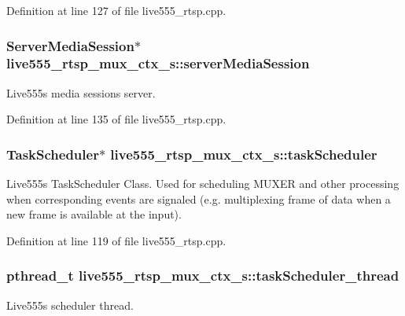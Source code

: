 Definition at line 127 of file live555\+\_\+rtsp.\+cpp.

\subsubsection[{\texorpdfstring{server\+Media\+Session}{serverMediaSession}}]{\setlength{\rightskip}{0pt plus 5cm}Server\+Media\+Session$\ast$ live555\+\_\+rtsp\+\_\+mux\+\_\+ctx\+\_\+s\+::server\+Media\+Session}\hypertarget{structlive555__rtsp__mux__ctx__s_acd9455b0d78bac504d4de35d55729e02}{}\label{structlive555__rtsp__mux__ctx__s_acd9455b0d78bac504d4de35d55729e02}
Live555\textquotesingle{}s media sessions server. 

Definition at line 135 of file live555\+\_\+rtsp.\+cpp.

\subsubsection[{\texorpdfstring{task\+Scheduler}{taskScheduler}}]{\setlength{\rightskip}{0pt plus 5cm}Task\+Scheduler$\ast$ live555\+\_\+rtsp\+\_\+mux\+\_\+ctx\+\_\+s\+::task\+Scheduler}\hypertarget{structlive555__rtsp__mux__ctx__s_a9cee4d2b64755aad6fd9d98fddcf0c30}{}\label{structlive555__rtsp__mux__ctx__s_a9cee4d2b64755aad6fd9d98fddcf0c30}
Live555\textquotesingle{}s Task\+Scheduler Class. Used for scheduling M\+U\+X\+ER and other processing when corresponding events are signaled (e.\+g. multiplexing frame of data when a new frame is available at the input). 

Definition at line 119 of file live555\+\_\+rtsp.\+cpp.

\subsubsection[{\texorpdfstring{task\+Scheduler\+\_\+thread}{taskScheduler_thread}}]{\setlength{\rightskip}{0pt plus 5cm}pthread\+\_\+t live555\+\_\+rtsp\+\_\+mux\+\_\+ctx\+\_\+s\+::task\+Scheduler\+\_\+thread}\hypertarget{structlive555__rtsp__mux__ctx__s_af825f93bf9fcae44c41ace5af235c8de}{}\label{structlive555__rtsp__mux__ctx__s_af825f93bf9fcae44c41ace5af235c8de}
Live555\textquotesingle{}s scheduler thread. 

